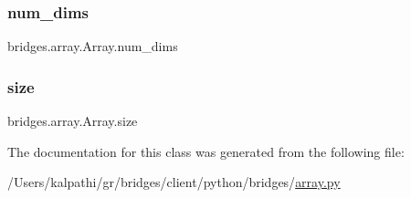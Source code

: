 \subsubsection{\texorpdfstring{num\+\_\+dims}{num\_dims}}
{\footnotesize\ttfamily bridges.\+array.\+Array.\+num\+\_\+dims}

\mbox{\label{classbridges_1_1array_1_1_array_aeac1b1639d0284500f354d41b40c38f7}} 
\subsubsection{\texorpdfstring{size}{size}}
{\footnotesize\ttfamily bridges.\+array.\+Array.\+size}



The documentation for this class was generated from the following file\+:\begin{DoxyCompactItemize}
\item 
/\+Users/kalpathi/gr/bridges/client/python/bridges/\mbox{\hyperlink{array_8py}{array.\+py}}\end{DoxyCompactItemize}

